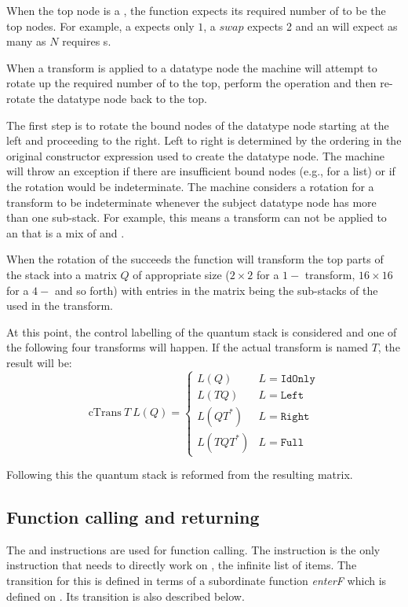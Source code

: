 When the top node is a \qubit, the function expects its required number
of \qubits{} to be the top nodes. For example, a \Had{} expects only $1$, a 
$swap$ expects 2 and an 
 will expect as many \qubits{} as $N$ requires
\bit{}s.

When a transform is applied to a  datatype node the
 machine will attempt to rotate up the 
required number of \qubits{} to the top, perform the operation and 
then re-rotate the datatype node back to the top. 

The first step is to rotate the bound 
nodes of the datatype node starting at the 
 left and proceeding to the  right. Left to right is determined by the 
 ordering in the original constructor expression used to create
the datatype node. The machine will throw 
an exception if  there are insufficient bound nodes (e.g., 
 for a list) or if the rotation would be indeterminate. 
The machine considers a rotation for a transform to be 
indeterminate whenever the subject datatype node has more than one
sub-stack. For example, this means a transform can not be applied to
an  that is a mix of   and
. 

When the rotation of the \qubits{} succeeds
 the function will transform the top parts of
the stack into a matrix $Q$ of appropriate size ($2\times2$ for a 
$1-$\qubit{} transform, $16\times16$ for 
a $4-$\qubit{} and so forth) with entries in the matrix
being the sub-stacks of the \qubits{} used in the transform. 

At this point, the control labelling 
of the quantum stack is considered and one of
the following four transforms will happen. If the actual transform
is named $T$, the result will be:
\begin{equation*}
\mathrm{cTrans}\ T\ L(Q) =
\begin{cases}
L(Q) & L= \mathrm{\texttt{IdOnly}}\\
L(T Q) & L= \mathrm{\texttt{Left}}\\
L(Q T^{*}) & L= \mathrm{\texttt{Right}}\\
L(T Q T^{*}) & L= \mathrm{\texttt{Full}}
\end{cases}
\end{equation*}

Following this the quantum stack is reformed from the resulting 
matrix. 

\subsection{Function calling and returning}\label{subsec:functioncalling}
The  and  instructions are used for 
function calling.
The  instruction is the only instruction that needs to 
directly work on \ms, the infinite list of \cms{} items. The transition
for this is defined in terms of a subordinate function \emph{enterF}
 which is 
defined on \bms. Its transition is also described below.


